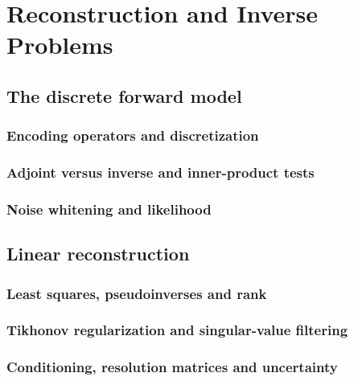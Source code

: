 \chapter{Reconstruction and Inverse Problems}
\label{ch:16}

\section{The discrete forward model}
\label{sec:16:the-discrete-forward-model}
\subsection{Encoding operators and discretization}
\subsection{Adjoint versus inverse and inner-product tests}
\subsection{Noise whitening and likelihood}

\section{Linear reconstruction}
\label{sec:16:linear-reconstruction}
\subsection{Least squares, pseudoinverses and rank}
\subsection{Tikhonov regularization and singular-value filtering}
\subsection{Conditioning, resolution matrices and uncertainty}

